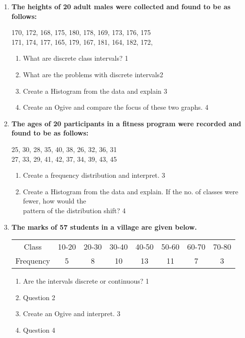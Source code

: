 \documentclass[a4paper,oneside]{book}
\begin{document}
\begin{enumerate}
   \item
	  \textbf{The heights of 20 adult males were collected and found to be as follows:}
	  \begin{center}
	  170, 172, 168, 175, 180, 178, 169, 173, 176, 175 \\
	  171, 174, 177, 165, 179, 167, 181, 164, 182, 172,  \\
	  \end{center}
  
  \begin{enumerate}
    \item
	What are discrete class intervals? \hfill 1
    \item
	What are the problems with discrete intervals\hfill 2
    \item  
	Create a Histogram from the data  and explain \hfill 3
    \item
	Create an Ogive and compare the focus of these two graphs. \hfill 4
  \end{enumerate}
  
  \item
  \textbf{The ages of 20 participants in a fitness program were recorded and found to be as follows:}
  \begin{center}
  25, 30, 28, 35, 40, 38, 26, 32, 36, 31 \\
  27, 33, 29, 41, 42, 37, 34, 39, 43, 45 \\
  \end{center}

  
  \begin{enumerate}
    \item  
	 Create a frequency distribution and interpret. \hfill 3
    \item
	Create a Histogram from the data and explain. If the no. of 
	classes were fewer, how would the \\ pattern of the distribution shift? \hfill 4
  \end{enumerate}
  
   \item
	  \textbf{The marks of 57 students in a village are given below.}
	  
	  \begin{table}[h]
	  \centering
\begin{tabular}{c|c|c|c|c|c|c|c}
Class     & 10-20 & 20-30 & 30-40 & 40-50 & 50-60 & 60-70 & 70-80 \\
Frequency & 5     & 8     & 10    & 13    & 11    & 7     & 3    
\end{tabular}
\end{table}
  
  \begin{enumerate}
    \item
	Are the intervals discrete or continuous? \hfill 1
    \item
	Question \hfill 2
    \item  
	Create an Ogive and interpret. \hfill 3
    \item
	Question \hfill 4
  \end{enumerate}
  
    \end{enumerate}
    
\end{document}
